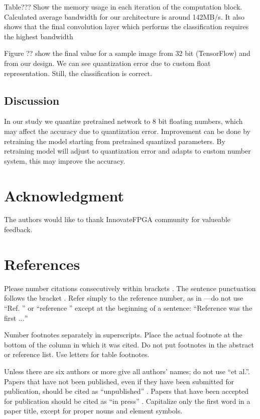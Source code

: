 \documentclass[conference]{IEEEtran}
\begin{document}
Table??? Show the memory usage in each iteration of the computation block. Calculated average bandwidth for our architecture is around 142MB/s. It also shows that the final convolution layer which performs the classification requires the highest bandwidth

Figure ?? show the final value for a sample image from 32 bit (TensorFlow) and from our design. We can see quantization error due to custom float representation. Still, the classification is correct. 



\subsection{Discussion}
In our study we quantize pretrained network to 8 bit floating numbers, which may affect the accuracy due to quantization error. Improvement can be done by retraining the model starting from pretrained quantized parameters. By retraining model will adjust to quantization error and adapts to custom number system, this may improve the accuracy.

\section*{Acknowledgment}
The authors would like to thank InnovateFPGA community for valueable feedback.

\section*{References}

Please number citations consecutively within brackets \cite{b1}. The 
sentence punctuation follows the bracket \cite{b2}. Refer simply to the reference 
number, as in \cite{b3}---do not use ``Ref. \cite{b3}'' or ``reference \cite{b3}'' except at 
the beginning of a sentence: ``Reference \cite{b3} was the first $\ldots$''

Number footnotes separately in superscripts. Place the actual footnote at 
the bottom of the column in which it was cited. Do not put footnotes in the 
abstract or reference list. Use letters for table footnotes.

Unless there are six authors or more give all authors' names; do not use 
``et al.''. Papers that have not been published, even if they have been 
submitted for publication, should be cited as ``unpublished'' \cite{b4}. Papers 
that have been accepted for publication should be cited as ``in press'' \cite{b5}. 
Capitalize only the first word in a paper title, except for proper nouns and 
element symbols.
\end{document}

